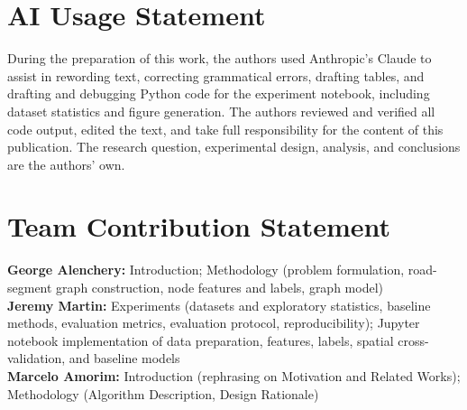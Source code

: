 \documentclass[letterpaper]{article}
\begin{document}




\section{AI Usage Statement}
During the preparation of this work, the authors used Anthropic's Claude to assist in rewording text, correcting grammatical errors, drafting tables, and drafting and debugging Python code for the experiment notebook, including dataset statistics and figure generation. The authors reviewed and verified all code output, edited the text, and take full responsibility for the content of this publication. The research question, experimental design, analysis, and conclusions are the authors' own.

\section{Team Contribution Statement}
\textbf{George Alenchery: } Introduction; Methodology (problem formulation, road-segment
graph construction, node features and labels, graph model) \\
\textbf{Jeremy Martin: } Experiments (datasets and exploratory statistics, baseline methods, evaluation metrics, evaluation protocol, reproducibility); Jupyter notebook implementation of data preparation, features, labels, spatial cross-validation, and baseline models \\
\textbf{Marcelo Amorim: } Introduction (rephrasing on Motivation and Related Works); Methodology (Algorithm Description, Design Rationale)\\
\end{document}

